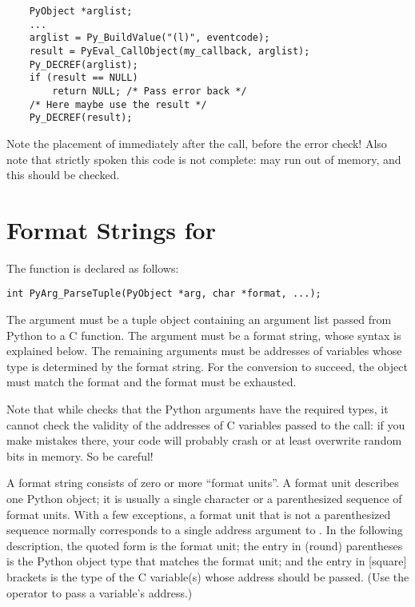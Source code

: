 \documentclass{manual}
\begin{document}
\begin{verbatim}
    PyObject *arglist;
    ...
    arglist = Py_BuildValue("(l)", eventcode);
    result = PyEval_CallObject(my_callback, arglist);
    Py_DECREF(arglist);
    if (result == NULL)
        return NULL; /* Pass error back */
    /* Here maybe use the result */
    Py_DECREF(result);
\end{verbatim}

Note the placement of  immediately after the
call, before the error check!  Also note that strictly spoken this
code is not complete:  may run out of
memory, and this should be checked.


\section{Format Strings for 
         \label{parseTuple}}

The  function is declared as follows:

\begin{verbatim}
int PyArg_ParseTuple(PyObject *arg, char *format, ...);
\end{verbatim}

The  argument must be a tuple object containing an argument
list passed from Python to a C function.  The  argument
must be a format string, whose syntax is explained below.  The
remaining arguments must be addresses of variables whose type is
determined by the format string.  For the conversion to succeed, the
 object must match the format and the format must be
exhausted.

Note that while  checks that the Python
arguments have the required types, it cannot check the validity of the
addresses of C variables passed to the call: if you make mistakes
there, your code will probably crash or at least overwrite random bits
in memory.  So be careful!

A format string consists of zero or more ``format units''.  A format
unit describes one Python object; it is usually a single character or
a parenthesized sequence of format units.  With a few exceptions, a
format unit that is not a parenthesized sequence normally corresponds
to a single address argument to .  In the
following description, the quoted form is the format unit; the entry
in (round) parentheses is the Python object type that matches the
format unit; and the entry in [square] brackets is the type of the C
variable(s) whose address should be passed.  (Use the \samp{\&}
operator to pass a variable's address.)
\end{document}
